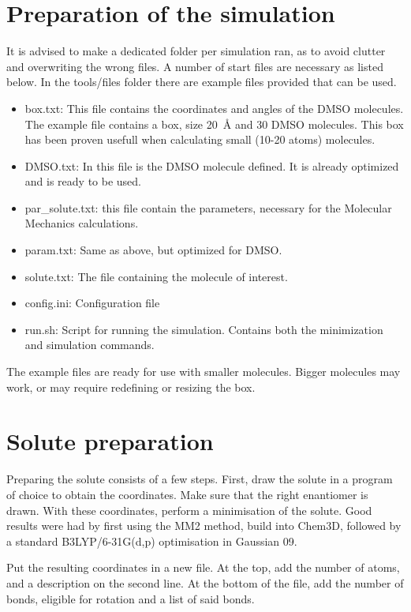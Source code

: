 \documentclass[a4paper,fleqn]{report}
\begin{document}
	
	\section{Preparation of the simulation}
	It is advised to make a dedicated folder per simulation ran, as to avoid 
	clutter and overwriting the wrong files.
	A number of start files are necessary as listed below.
	In the tools/files folder there are example files provided that can be 
	used.
	
	\begin{itemize}
		\setlength{\itemsep}{-1pt}
		\setlength{\parsep}{-1pt}
		\item box.txt: This file contains the coordinates and angles of the 
		DMSO molecules. The example file contains a box, size 
		\SI{20}{\angstrom} and 30 DMSO molecules.
		This box has been proven usefull when calculating 
		small (10-20 atoms) molecules.
		\item DMSO.txt: In this file is the DMSO molecule defined. It is 
		already optimized and is ready to be used.
		\item par\_solute.txt: this file contain the parameters, necessary for 
		the Molecular Mechanics calculations.\cite{Robertson2015}
		\item param.txt: Same as above, but optimized for DMSO.\cite{Liu1995}
		\item solute.txt: The file containing the molecule of interest.
		\item config.ini: Configuration file
		\item run.sh: Script for running the simulation. Contains both the 
		minimization and simulation commands.
	\end{itemize}
	
	The example files are ready for use with smaller molecules.
	Bigger molecules may work, or may require redefining or resizing the box.
	
	\section{Solute preparation}
	Preparing the solute consists of a few steps.
	First, draw the solute in a program of choice to obtain the coordinates.
	Make sure that the right enantiomer is drawn. With these coordinates, 
	perform a minimisation of the solute.
	Good results were had by first using the MM2 method, build into Chem3D, 
	followed by a standard B3LYP/6-31G(d,p) optimisation in Gaussian 09.
	
	Put the resulting coordinates in a new file. At the top, add the number of 
	atoms, and a description on the second line.
	At the bottom of the file, add the number of bonds, eligible for rotation 
	and a list of said bonds.
	
\end{document}
